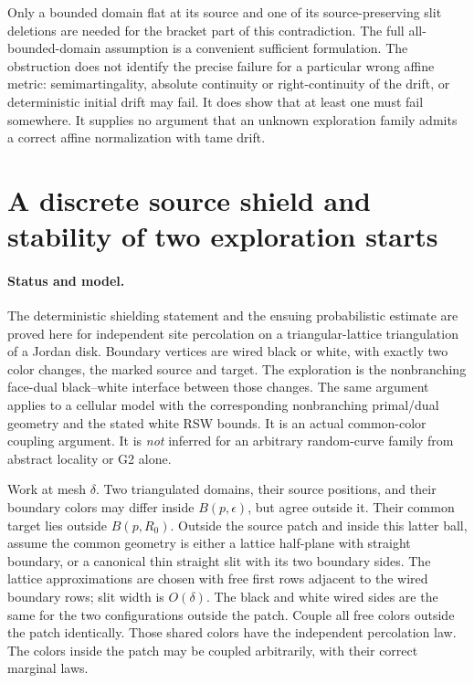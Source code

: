 \documentclass[11pt]{article}
\theoremstyle{definition}\newtheorem{definition}[theorem]{Definition}
\theoremstyle{remark}\newtheorem{remark}[theorem]{Remark}
\begin{document}
Only a bounded domain flat at its source and one of its source-preserving
slit deletions are needed for the bracket part of this contradiction.
The full all-bounded-domain assumption is a convenient sufficient
formulation.  The obstruction does not identify the precise failure for a
particular wrong affine metric: semimartingality, absolute continuity or
right-continuity of the drift, or deterministic initial drift may fail.
It does show that at least one must fail somewhere.  It supplies no argument
that an unknown exploration family admits a correct affine normalization
with tame drift.

\section{A discrete source shield and stability of two exploration starts}
\label{sec:source-shield}

\paragraph{Status and model.}
The deterministic shielding statement and the ensuing probabilistic estimate
are proved here for independent site percolation on a triangular-lattice
triangulation of a Jordan disk. Boundary vertices are wired black or white,
with exactly two color changes, the marked source and target. The exploration
is the nonbranching face-dual black--white interface between those changes.
The same argument applies to a cellular model with the corresponding
nonbranching primal/dual geometry and the stated white RSW bounds.
It is an actual common-color coupling argument. It is \emph{not} inferred
for an arbitrary random-curve family from abstract locality or G2 alone.

Work at mesh $\delta$. Two triangulated domains, their source positions,
and their boundary colors may differ inside $B(p,\epsilon)$, but agree
outside it. Their common target lies outside $B(p,R_0)$.
Outside the source patch and inside this latter ball, assume the common
geometry is either a lattice half-plane with straight boundary, or a
canonical thin straight slit with its two boundary sides. The lattice
approximations are chosen with free first rows adjacent to the wired
boundary rows; slit width is $O(\delta)$. The black and white wired sides
are the same for the two configurations outside the patch.
Couple all free colors outside the patch identically. Those shared colors
have the independent percolation law. The colors inside the patch may be
coupled arbitrarily, with their correct marginal laws.
\end{document}

